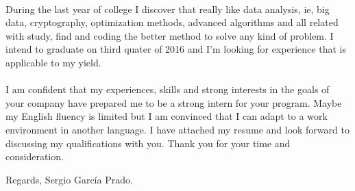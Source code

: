 \documentclass[]{friggeri-cv} %
\begin{document}
    \paragraph{}
    During the last year of college I discover that really like data analysis, ie, big data, cryptography, optimization methods, advanced algorithms and all related with study, find and coding the better method to solve any kind of problem. I intend to graduate on third quater of 2016 and I'm looking for experience that is applicable to my yield.

    \paragraph{}
    I am confident that my experiences, skills and strong interests in the goals of your company have prepared me to be a strong intern for your program. Maybe my English fluency is limited but I am convinced that I can adapt to a work environment in another language. I have attached my resume and look forward to discussing my qualifications with you. Thank you for your time and consideration.


    \noindent Regards,
    \newline Sergio García Prado.
\end{document}
